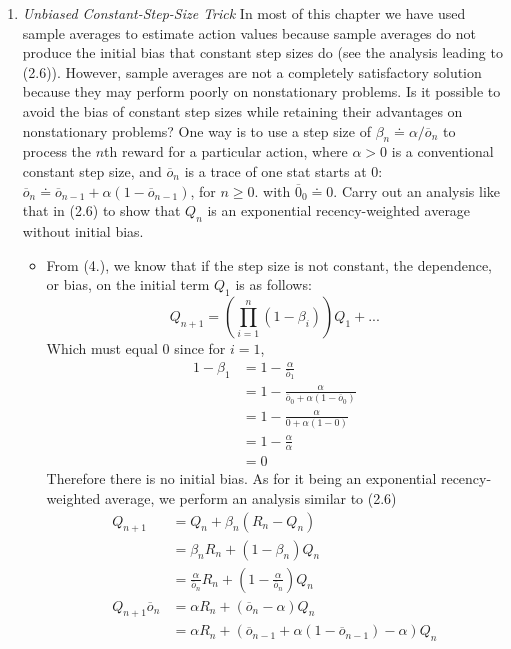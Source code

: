 \documentclass{article}
\begin{document}
\begin{enumerate}
    \item \emph{Unbiased Constant-Step-Size Trick} In most of this chapter we have used sample averages to estimate action values because sample averages do not produce the initial bias that constant step sizes do (see the analysis leading to (2.6)). However, sample averages are not a completely satisfactory solution because they may perform poorly on nonstationary problems. Is it possible to avoid the bias of constant step sizes while retaining their advantages on nonstationary problems? One way is to use a step size of $\beta_n \doteq \alpha/\overline{o}_n$ to process the $n$th reward for a particular action, where $\alpha > 0$ is a conventional constant step size, and $\overline{o}_n$ is a trace of one stat starts at $0$: $\overline{o}_n \doteq \overline{o}_{n-1} + \alpha (1 - \overline{o}_{n-1})$, for $n \geq 0$. with $\overline{0}_0 \doteq 0$. Carry out an analysis like that in (2.6) to show that $Q_n$ is an exponential recency-weighted average without initial bias.
    \begin{itemize}
        \item From (4.), we know that if the step size is not constant, the dependence, or bias, on the initial term $Q_1$ is as follows:
        $$Q_{n+1} = \left(\prod^{n}_{i=1}(1-\beta_i)\right)Q_1 + ...$$
        Which must equal $0$ since for $i=1$,
        \begin{align}
            1-\beta_1  &= 1 - \frac{\alpha}{\overline{o}_1} \\
            &= 1 - \frac{\alpha}{\overline{o}_0 + \alpha(1 - \overline{o}_0)} \\
            &= 1 - \frac{\alpha}{0 + \alpha(1 - 0)} \\
            &= 1 - \frac{\alpha}{\alpha} \\
            &= 0
        \end{align}
        Therefore there is no initial bias. As for it being an exponential recency-weighted average, we perform an analysis similar to (2.6)
        \begin{align}
            Q_{n+1} &= Q_n + \beta_n(R_n - Q_n) \\
            &= \beta_n R_n + (1 - \beta_n) Q_n \\
            &= \frac{\alpha}{\overline{o}_n} R_n + \left(1 - \frac{\alpha}{\overline{o}_n}\right)Q_n \\
            Q_{n+1} \overline{o}_n &= \alpha R_n + (\overline{o}_n - \alpha)Q_n \\
            &= \alpha R_n + (\overline{o}_{n-1} + \alpha(1 - \overline{o}_{n-1}) - \alpha) Q_n \\

\end{align}
\end{itemize}
\end{enumerate}
\end{document}
